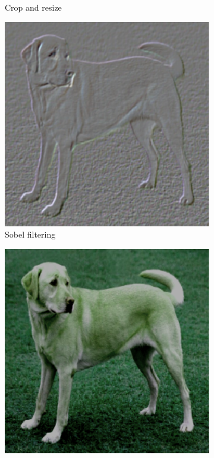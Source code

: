 \begin{figure}[th]
\begin{subfigure}{.19\textwidth}
  \caption{Crop and resize}
\end{subfigure}\begin{subfigure}{.19\textwidth}
  \centering
  \includegraphics[width=0.9\linewidth]{chapters/assets/ssl_figs/transforms/img_sobel.pdf}
  \caption{Sobel filtering}
\end{subfigure}\begin{subfigure}{.19\textwidth}
  \centering
  \includegraphics[width=0.9\linewidth]{chapters/assets/ssl_figs/transforms/img_color1.pdf}

\end{subfigure}
\end{figure}
